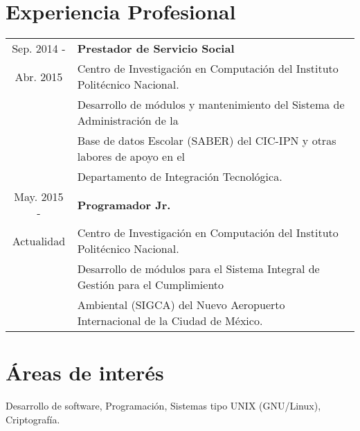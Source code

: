 \documentclass[11pt, letterpaper, oneside]{report}
\begin{document}
	\section{Experiencia Profesional}
	\justify
	\begin{tabular}{c l}
	Sep. 2014 - & \textbf{Prestador de Servicio Social} \\
	Abr. 2015 & Centro de Investigación en Computación del Instituto Politécnico Nacional. \\[2mm]
	 & Desarrollo de módulos y mantenimiento del Sistema de Administración de la \\
	 & Base de datos Escolar (SABER) del CIC-IPN y otras labores de apoyo en el \\
	 & Departamento de Integración Tecnológica. \\[5mm]

	May. 2015 - & \textbf{Programador Jr.} \\
	Actualidad & Centro de Investigación en Computación del Instituto Politécnico Nacional. \\[2mm]
	 & Desarrollo de módulos para el Sistema Integral de Gestión para el Cumplimiento \\ 
	 & Ambiental (SIGCA) del Nuevo Aeropuerto Internacional de la Ciudad de México.
	\end{tabular}

	\section{Áreas de interés} 
	\justify
	Desarrollo de software, Programación, Sistemas tipo UNIX (GNU/Linux), Criptografía.
\end{document}
